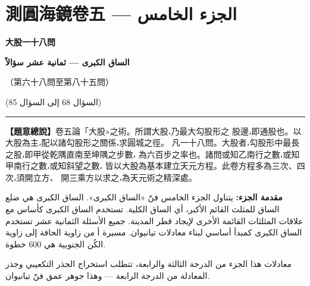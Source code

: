\documentclass[11pt,a4paper]{article}
\newcommand{\ar}[1]{\arabicfont\beginR #1\endR}
\newcommand{\longline}{\noindent\rule{\textwidth}{0.4pt}}
\newcounter{probnum}
\begin{document}
\newpage

\setcounter{probnum}{0}

\section{測圓海鏡卷五 — \ar{الجزء الخامس}}
\label{sec:vol5}

\begin{center}
{\Large\bfseries\color{volcolor} 大股一十八問}

\vspace{0.2cm}

{\fontsize{14}{18}\selectfont\arabicfont\beginR\color{volcolor}\textbf{الساق الكبرى — ثمانية عشر سؤالاً}\endR}

\vspace{0.2cm}

{\small\color{notecolor} （第六十八問至第八十五問）}

{\small\color{notecolor}\arabicfont\beginR (السؤال 68 إلى السؤال 85)\endR}
\end{center}

\vspace{0.3cm}
\longline
\vspace{0.3cm}

\noindent
\begin{minipage}[t]{0.48\textwidth}
\textbf{【題意總說】}卷五論「大股»之術。所謂大股،乃最大勾股形之
股邊،即通股也。以大股為主،配以諸勾股形之關係،求圓城之徑。
凡一十八問。大股者،勾股形中最長之股،即甲從乾隅直南至坤隅之步數،
為六百步之率也。諸問或知乙南行之數،或知甲南行之數،或知斜望之數،
皆以大股為基本建立天元方程。此卷方程多為三次、四次،須開立方、
開三乘方以求之،為天元術之精深處。
\end{minipage}
\hfill
\begin{minipage}[t]{0.48\textwidth}
\arabicfont\beginR
\textbf{مقدمة الجزء:} يتناول الجزء الخامس فنّ «الساق الكبرى».
الساق الكبرى هي ضلع الساق للمثلث القائم الأكبر، أي الساق الكلية.
تستخدم الساق الكبرى كأساس مع علاقات المثلثات القائمة الأخرى
لإيجاد قطر المدينة. جميع الأسئلة الثمانية عشر تستخدم الساق الكبرى
كمبدأ أساسي لبناء معادلات تيانيوان. مسيرة أ من زاوية الحافة إلى
زاوية الكُن الجنوبية هي 600 خطوة.

معادلات هذا الجزء من الدرجة الثالثة والرابعة، تتطلب استخراج
الجذر التكعيبي وجذر المعادلة من الدرجة الرابعة — وهذا جوهر
عمق فنّ تيانيوان.
\endR
\end{minipage}
\end{document}
